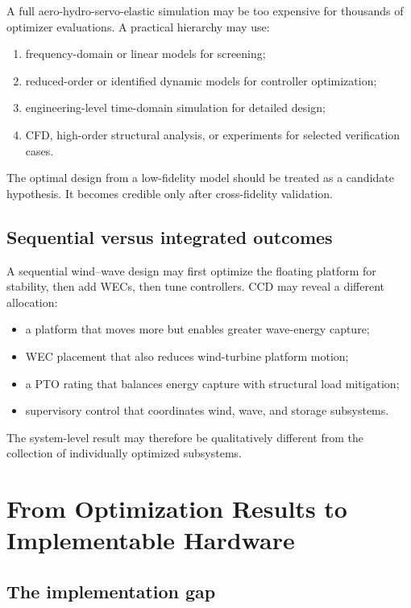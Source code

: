 \documentclass[11pt]{article}
\begin{document}
A full aero-hydro-servo-elastic simulation may be too expensive for thousands of optimizer evaluations. A practical hierarchy may use:
\begin{enumerate}[leftmargin=1.5em]
  \item frequency-domain or linear models for screening;
  \item reduced-order or identified dynamic models for controller optimization;
  \item engineering-level time-domain simulation for detailed design;
  \item CFD, high-order structural analysis, or experiments for selected verification cases.
\end{enumerate}

The optimal design from a low-fidelity model should be treated as a candidate hypothesis. It becomes credible only after cross-fidelity validation.

\subsection{Sequential versus integrated outcomes}

A sequential wind--wave design may first optimize the floating platform for stability, then add WECs, then tune controllers. CCD may reveal a different allocation:
\begin{itemize}[leftmargin=1.4em]
  \item a platform that moves more but enables greater wave-energy capture;
  \item WEC placement that also reduces wind-turbine platform motion;
  \item a PTO rating that balances energy capture with structural load mitigation;
  \item supervisory control that coordinates wind, wave, and storage subsystems.
\end{itemize}

The system-level result may therefore be qualitatively different from the collection of individually optimized subsystems.

\section{From Optimization Results to Implementable Hardware}

\subsection{The implementation gap}
\end{document}

